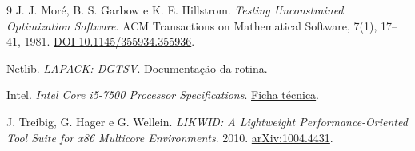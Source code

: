 \documentclass[11pt,a4paper]{article}
\begin{document}
\small
\begin{thebibliography}{9}
J. J. Moré, B. S. Garbow e K. E. Hillstrom.
\textit{Testing Unconstrained Optimization Software}. ACM Transactions on
Mathematical Software, 7(1), 17–41, 1981.
\href{https://doi.org/10.1145/355934.355936}{DOI 10.1145/355934.355936}.

Netlib. \textit{LAPACK: DGTSV}.
\href{https://netlib.org/lapack/explore-html/d6/ddb/group__gtsv_ga6b06a11b8e2dced10bc9cd3c20a09484.html}{Documentação da rotina}.

Intel. \textit{Intel Core i5-7500 Processor Specifications}.
\href{https://www.intel.com/content/www/us/en/products/sku/97123/intel-core-i57500-processor-6m-cache-up-to-3-80-ghz/specifications.html}{Ficha técnica}.

J. Treibig, G. Hager e G. Wellein.
\textit{LIKWID: A Lightweight Performance-Oriented Tool Suite for x86 Multicore Environments}.
2010. \href{https://arxiv.org/abs/1004.4431}{arXiv:1004.4431}.
\end{thebibliography}
\end{document}
